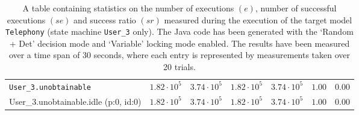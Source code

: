 \begin{table}[htbp]
{\begin{tabular}{lrrrrrr}
\\[-8pt]\texttt{User\_3.unobtainable}                 &  $1.82 \cdot 10^{5}$ &  $3.74 \cdot 10^{5}$ &  $1.82 \cdot 10^{5}$ &  $3.74 \cdot 10^{5}$ &               $1.00$ &               $0.00$ \\
\hspace{3mm}User\_3.unobtainable.idle (p:0, id:0)     &  $1.82 \cdot 10^{5}$ &  $3.74 \cdot 10^{5}$ &  $1.82 \cdot 10^{5}$ &  $3.74 \cdot 10^{5}$ &               $1.00$ &               $0.00$ \\
\bottomrule
\end{tabular}
}
\caption{A table containing statistics on the number of executions $(e)$, number of successful executions $(se)$ and success ratio $(sr)$ measured during the execution of the target model \texttt{Telephony} (state machine \texttt{User\_3} only). The Java code has been generated with the `Random + Det' decision mode and `Variable' locking mode enabled. The results have been measured over a time span of 30 seconds, where each entry is represented by measurements taken over 20 trials.}
\label{table:frequency_results_telephony_random_det_variable_user_3}
\end{table}